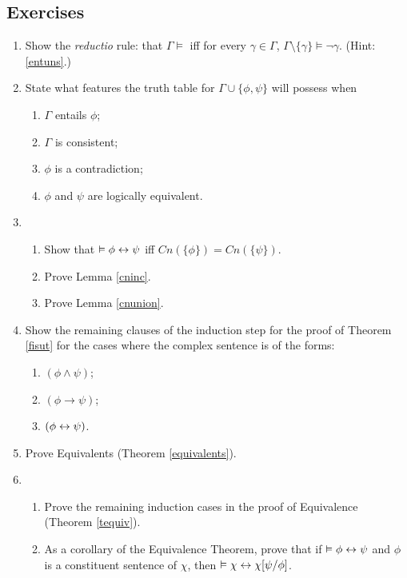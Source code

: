 {\small


\subsection*{Exercises} \label{ex4}


\begin{enumerate}
	\item Show the \emph{reductio} rule: that $\Gamma \vDash$ iff  for every $\gamma \in \Gamma$, $\Gamma\setminus\{\gamma\} \vDash ¬\gamma$. (Hint: \autoref{entuns}.)

	\item State what features the truth table for $\Gamma \cup \{\phi,\psi\}$ will possess when \begin{enumerate}
		\item $\Gamma$ entails $\phi$;
		\item $\Gamma$ is consistent;
		\item $\phi$ is a contradiction;
		\item $\phi$ and $\psi$ are logically equivalent.
	\end{enumerate}
	
\item \begin{enumerate}
	\item Show that $\vDash \phi \leftrightarrow \psi$ iff $Cn(\{\phi\})=Cn(\{\psi\})$.
	\item Prove Lemma \ref{cninc}.
	\item Prove Lemma \ref{cnunion}.
\end{enumerate}

\item Show the remaining clauses of the induction step for the proof of Theorem \ref{fisut} for the cases where the complex sentence is of the forms: \begin{enumerate}
	\item $(\phi \wedge \psi)$;
	\item $(\phi \to \psi)$;
	\item $(\phi \leftrightarrow \psi)$.
\end{enumerate}



\item Prove Equivalents (Theorem \ref{equivalents}).



\item \begin{enumerate}
	\item Prove the remaining induction cases in the proof of Equivalence (Theorem \ref{tequiv}).
	\item As a corollary of the Equivalence Theorem, prove that if $\vDash \phi\leftrightarrow\psi$ and $\phi$ is a constituent sentence of $\chi$, then $\vDash \chi \leftrightarrow \chi[\psi/\phi]$.
\end{enumerate}


\end{enumerate}}
